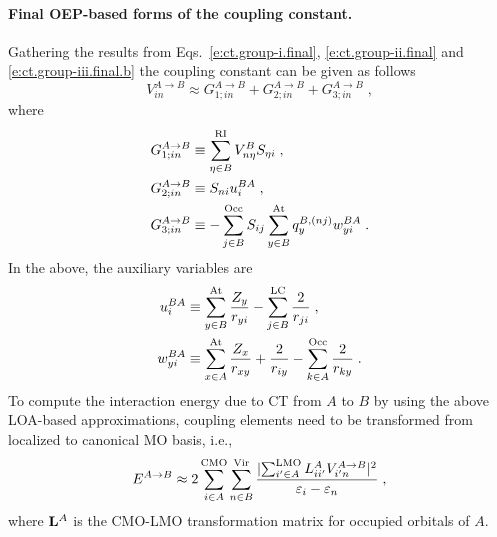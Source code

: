 \documentclass[aip,jcp,amsmath,amssymb,reprint,floatfix]{revtex4-1}
\begin{document}
\paragraph{Final OEP-based forms of the coupling constant.}
Gathering the results from Eqs.~\eqref{e:ct.group-i.final},
\eqref{e:ct.group-ii.final} and \eqref{e:ct.group-iii.final.b} the coupling constant
can be given as follows
%
\begin{equation} \label{e:ct-murell-etal.vin.oep}
V_{in}^{A\rightarrow B} 
       \approx 
 G_{1;in}^{A\rightarrow B} 
+G_{2;in}^{A\rightarrow B} 
+G_{3;in}^{A\rightarrow B} \;,
\end{equation}
%
where
%
\begin{subequations} \label{e:ct-murrell-etal.vin.oep-gterms}
\begin{align}
 G_{1;in}^{A\rightarrow B} &\equiv \sum_{\eta\in B}^{\rm RI} V^B_{n\eta} S_{\eta i} \;, \\
 G_{2;in}^{A\rightarrow B} &\equiv S_{ni} u_i^{BA} \;, \\
 G_{3;in}^{A\rightarrow B} &\equiv
 -\sum_{j   \in B}^{\rm Occ} S_{ij}
  \sum_{y   \in B}^{\rm At} q_y^{B,(nj)} w_{yi}^{BA}
\;.
\end{align}
\end{subequations}
%
In the above, the auxiliary variables are
%
\begin{subequations} \label{e:ct-murell-etal.vin.oep.aux-var}
\begin{align} \label{e:ct-murell-etal.vin.oep.aux-var.u} 
 u_i^{BA} &\equiv    
 \sum_{y\in B}^{\rm At}
  \frac{Z_y}{ r_{yi} } 
 -
 \sum_{j\in B}^{\rm LC}
  \frac{2}{r_{ji}} 
                \;, \\ 
 w_{yi}^{BA} &\equiv 
   \sum_{x\in A}^{\rm At}
   \frac{Z_x}{r_{xy}}
  + \frac{2}{r_{iy}}
  - \sum_{k\in A}^{\rm Occ}
    \frac{2}{r_{ky}} 
                \;.
  \label{e:ct-murell-etal.vin.oep.aux-var.w}
\end{align}
\end{subequations}
%
To compute the interaction energy due to CT from $A$ to $B$ by using the above LOA\hyp{}based
approximations, coupling elements need to be transformed from localized to canonical MO basis, i.e.,
%
\begin{equation} \label{e:ect-oep.prefinal}
 E^{A\rightarrow B} \approx 
 2 
 \sum_{i\in A}^{\rm CMO}
 \sum_{n\in B}^{\rm Vir}
 \frac{
 \lvert
   \sum_{i'\in A}^{\rm LMO} L_{ii'}^A
   V_{i'n}^{A\rightarrow B}
 \rvert^2 }{\varepsilon_i - \varepsilon_n} \;,
\end{equation}
%
where ${\bf L}^A$ is the CMO\hyp{}LMO transformation matrix for occupied orbitals of $A$. 
\end{document}
